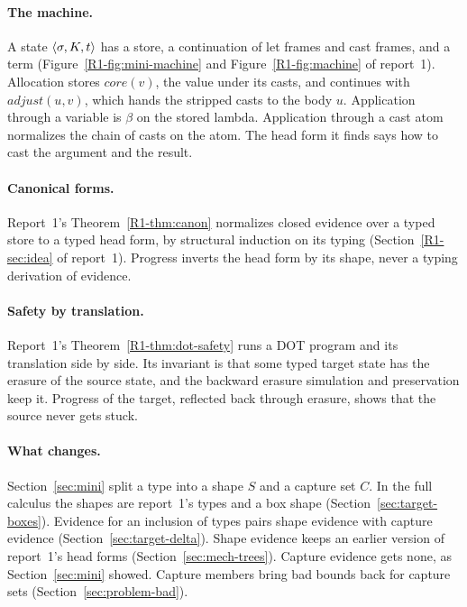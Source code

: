 \paragraph{The machine.}
A state $\langle \sigma, K, t\rangle$ has a store, a continuation of let frames and cast frames, and a term (Figure~\ref{R1-fig:mini-machine} and Figure~\ref{R1-fig:machine} of report~1). Allocation stores $\mathit{core}(v)$, the value under its casts, and continues with $\mathit{adjust}(u, v)$, which hands the stripped casts to the body $u$. Application through a variable is $\beta$ on the stored lambda. Application through a cast atom normalizes the chain of casts on the atom. The head form it finds says how to cast the argument and the result.

\paragraph{Canonical forms.}
Report~1's Theorem~\ref{R1-thm:canon} normalizes closed evidence over a typed store to a typed head form, by structural induction on its typing (Section~\ref{R1-sec:idea} of report~1). Progress inverts the head form by its shape, never a typing derivation of evidence.

\paragraph{Safety by translation.}
Report~1's Theorem~\ref{R1-thm:dot-safety} runs a DOT program and its translation side by side. Its invariant is that some typed target state has the erasure of the source state, and the backward erasure simulation and preservation keep it. Progress of the target, reflected back through erasure, shows that the source never gets stuck.

\paragraph{What changes.}
Section~\ref{sec:mini} split a type into a shape $S$ and a capture set $C$. In the full calculus the shapes are report~1's types and a box shape (Section~\ref{sec:target-boxes}). Evidence for an inclusion of types pairs shape evidence with capture evidence (Section~\ref{sec:target-delta}). Shape evidence keeps an earlier version of report~1's head forms (Section~\ref{sec:mech-trees}). Capture evidence gets none, as Section~\ref{sec:mini} showed. Capture members bring bad bounds back for capture sets (Section~\ref{sec:problem-bad}).
